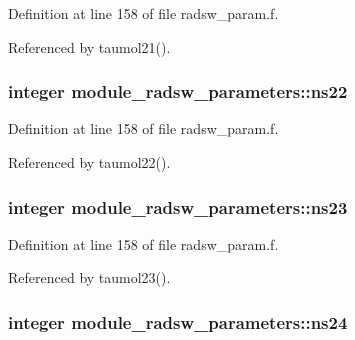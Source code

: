 Definition at line 158 of file radsw\+\_\+param.\+f.



Referenced by taumol21().

\subsubsection[{\texorpdfstring{ns22}{ns22}}]{\setlength{\rightskip}{0pt plus 5cm}integer module\+\_\+radsw\+\_\+parameters\+::ns22}\hypertarget{namespacemodule__radsw__parameters_a194fffaa7b04c97d8133a9e5686e94d5}{}\label{namespacemodule__radsw__parameters_a194fffaa7b04c97d8133a9e5686e94d5}


Definition at line 158 of file radsw\+\_\+param.\+f.



Referenced by taumol22().

\subsubsection[{\texorpdfstring{ns23}{ns23}}]{\setlength{\rightskip}{0pt plus 5cm}integer module\+\_\+radsw\+\_\+parameters\+::ns23}\hypertarget{namespacemodule__radsw__parameters_a547ab92fedb3e35198b384f0337a752c}{}\label{namespacemodule__radsw__parameters_a547ab92fedb3e35198b384f0337a752c}


Definition at line 158 of file radsw\+\_\+param.\+f.



Referenced by taumol23().

\subsubsection[{\texorpdfstring{ns24}{ns24}}]{\setlength{\rightskip}{0pt plus 5cm}integer module\+\_\+radsw\+\_\+parameters\+::ns24}\hypertarget{namespacemodule__radsw__parameters_a3cdaa790f548b6407ba586a824c5edc6}{}\label{namespacemodule__radsw__parameters_a3cdaa790f548b6407ba586a824c5edc6}


